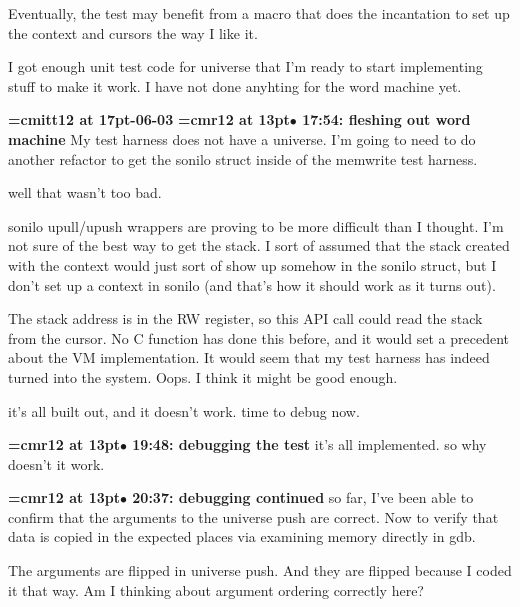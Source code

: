 Eventually, the test may benefit from a macro that does the incantation to set up the context and cursors the way I like it.
\par

I got enough unit test code for universe that I'm ready to start implementing stuff to make it work. I have not done anyhting for the word machine yet.
\par

{\medskip\noindent\bf\font\titlefont=cmitt12 at 17pt-06-03}\medskip
{\smallskip\noindent\bf\font\titlefont=cmr12 at 13pt\titlefont $\bullet$ 17:54: fleshing out word machine}\smallskip
My test harness does not have a universe. I'm going to need to do another refactor to get the sonilo struct inside of the memwrite test harness.
\par

well that wasn't too bad.
\par

sonilo upull/upush wrappers are proving to be more difficult than I thought. I'm not sure of the best way to get the stack. I sort of assumed that the stack created with the context would just sort of show up somehow in the sonilo struct, but I don't set up a context in sonilo (and that's how it should work as it turns out).
\par

The stack address is in the RW register, so this API call could read the stack from the cursor. No C function has done this before, and it would set a precedent about the VM implementation. It would seem that my test harness has indeed turned into the system. Oops. I think it might be good enough.
\par

it's all built out, and it doesn't work. time to debug now.
\par

{\smallskip\noindent\bf\font\titlefont=cmr12 at 13pt\titlefont $\bullet$ 19:48: debugging the test}\smallskip
it's all implemented. so why doesn't it work.
\par

{\smallskip\noindent\bf\font\titlefont=cmr12 at 13pt\titlefont $\bullet$ 20:37: debugging continued}\smallskip
so far, I've been able to confirm that the arguments to the universe push are correct. Now to verify that data is copied in the expected places via examining memory directly in gdb.
\par

The arguments are flipped in universe push. And they are flipped because I coded it that way. Am I thinking about argument ordering correctly here?
\par

